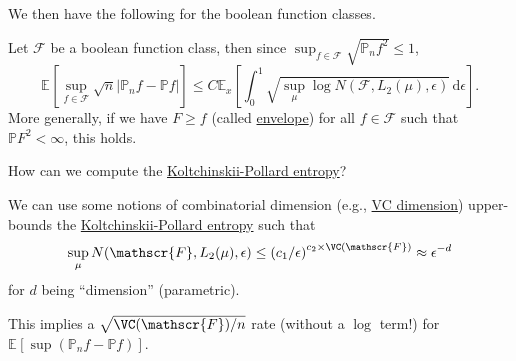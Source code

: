 We then have the following for the boolean function classes.

\begin{intuition}\label{int:main-bound}
	Let \(\mathscr{F} \) be a boolean function class, then since \(\sup _{f\in\mathscr{F} } \sqrt{\mathbb{P} _n f^2} \leq 1\),
	\[
		\mathbb{E}_{}\left[\sup _{f\in \mathscr{F} } \sqrt{n} \vert \mathbb{P} _n f - \mathbb{P} f \vert  \right]
		\leq C \mathbb{E}_{x}\left[ \int_{0}^{1} \sqrt{\sup _\mu \log N(\mathscr{F} , L_2(\mu ), \epsilon )}  \,\mathrm{d}\epsilon \right].
	\]
	More generally, if we have \(F \geq f\) (called \hyperref[def:envelope]{envelope}) for all \(f\in \mathscr{F} \) such that \(\mathbb{P} F^2 < \infty \), this holds.
\end{intuition}

\begin{problem*}\label{prb:lec13}
	How can we compute the \hyperref[def:Koltchinskii-Pollard-entropy]{Koltchinskii-Pollard entropy}?
\end{problem*}
\begin{answer}
	We can use some notions of combinatorial dimension (e.g., \hyperref[def:VC-dimension]{VC dimension}) upper-bounds the \hyperref[def:Koltchinskii-Pollard-entropy]{Koltchinskii-Pollard entropy} such that
	\[
		\sup _\mu N(\mathscr{F} , L_2(\mu ), \epsilon )
		\leq \left( c_1 / \epsilon \right) ^{c_2 \times \VC(\mathscr{F} )}
		\approx \epsilon ^{-d}
	\]
	for \(d\) being ``dimension'' (parametric).
\end{answer}

\begin{remark}
	This implies a \(\sqrt{\VC(\mathscr{F} ) / n} \) rate (without a \(\log \) term!) for \(\mathbb{E}_{}\left[\sup (\mathbb{P} _n f - \mathbb{P} f) \right] \).
\end{remark}